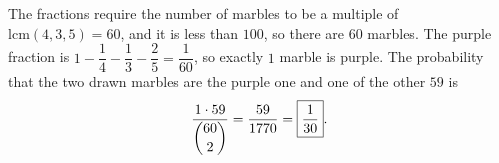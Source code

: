 The fractions require the number of marbles to be a multiple of $\mathrm{lcm}(4,3,5)=60$, and it is less than $100$, so there are $60$ marbles. The purple fraction is $1-\dfrac14-\dfrac13-\dfrac25=\dfrac1{60}$, so exactly $1$ marble is purple. The probability that the two drawn marbles are the purple one and one of the other $59$ is
\[\dfrac{1\cdot59}{\dbinom{60}{2}}=\dfrac{59}{1770}=\boxed{\dfrac{1}{30}}.\]
